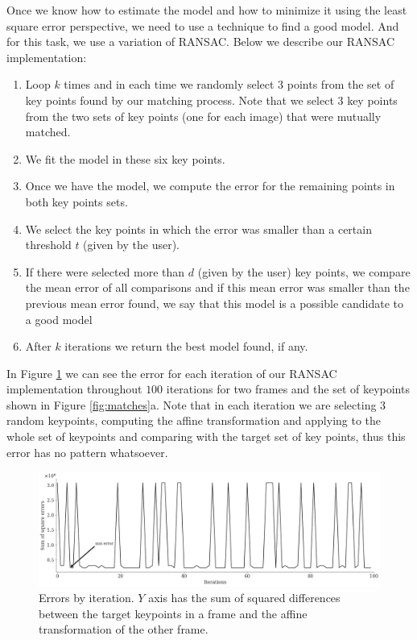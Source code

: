 \documentclass[]{IEEEtran}
\begin{document}
  Once we know how to estimate the model and how to minimize it using the least square error perspective, we need to use a technique to find a good model. And for this task, we use a variation of RANSAC. Below we describe our RANSAC implementation:
  \begin{enumerate}
     \item Loop $k$ times and in each time we randomly select $3$ points from the set of key points found by our matching process. Note that we select $3$ key points from the two sets of key points (one for each image) that were mutually matched.
     \item We fit the model in these six key points.
     \item Once we have the model, we compute the error for the remaining points in both key points sets.
     \item We select the key points in which the error was smaller than a certain threshold $t$ (given by the user).
     \item If there were selected more than $d$ (given by the user) key points, we compare the mean error of all comparisons and if this mean error was smaller than the previous mean error found, we say that this model is a possible candidate to a good model
     \item After $k$ iterations we return the best model found, if any.
  \end{enumerate}
  In Figure \ref{fig:ransac_error} we can see the error for each iteration of our RANSAC implementation throughout $100$ iterations for two frames and the set of keypoints shown in Figure \ref{fig:matches}a. Note that in each iteration we are selecting $3$ random keypoints, computing the affine transformation and applying to the whole set of keypoints and comparing with the target set of key points, thus this error has no pattern whatsoever.

  \begin{figure}[tb]
  \centering
  \includegraphics[width=0.8\linewidth]{./figures/ransac_error.png}
  \caption{Errors by iteration. $Y$ axis has the sum of squared differences between the target keypoints in a frame and the affine transformation of the other frame.}
  \label{fig:ransac_error}
\end{figure}
\end{document}
